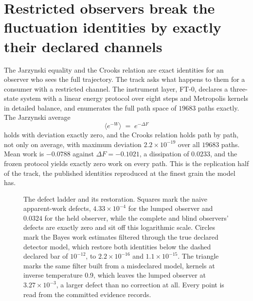 \documentclass[aps,pre,reprint,nofootinbib,floatfix]{revtex4-2}
\begin{document}
\section{Restricted observers break the fluctuation identities by
exactly their declared channels}
\label{sec:ft}

The Jarzynski equality \cite{Jarzynski1997} and the Crooks relation
\cite{Crooks1999} are exact identities for an observer who sees the
full trajectory.  The track asks what happens to them for a
consumer with a restricted channel.  The instrument layer, FT-0,
declares a three-state system with a linear energy protocol over
eight steps and Metropolis kernels in detailed balance, and
enumerates the full path space of $19683$ paths exactly.  The
Jarzynski average
\begin{equation}
  \bigl\langle e^{-W} \bigr\rangle \;=\; e^{-\Delta F}
  \label{eq:jarzynski}
\end{equation}
holds with deviation exactly zero, and the Crooks relation holds
path by path, not only on average, with maximum deviation
$2.2\times10^{-19}$ over all $19683$ paths.  Mean work is
$-0.0788$ against $\Delta F = -0.1021$, a dissipation of $0.0233$,
and the frozen protocol yields exactly zero work on every path.
This is the replication half of the track, the published identities
reproduced at the finest grain the model has.

\begin{figure}[t]
\centering
{}
\caption{The defect ladder and its restoration.  Squares mark the
naive apparent-work defects, $4.33\times10^{-4}$ for the lumped
observer and $0.0324$ for the held observer, while the complete
and blind observers' defects are exactly zero and sit off this
logarithmic scale.  Circles mark the Bayes work estimates filtered
through the true declared detector model, which restore both
identities below the dashed declared bar of $10^{-12}$, to
$2.2\times10^{-16}$ and $1.1\times10^{-15}$.  The triangle marks
the same filter built from a misdeclared model, kernels at inverse
temperature 0.9, which leaves the lumped observer at
$3.27\times10^{-3}$, a larger defect than no correction at all.
Every point is read from the committed evidence records.}
\label{fig:ft}
\end{figure}
\end{document}
